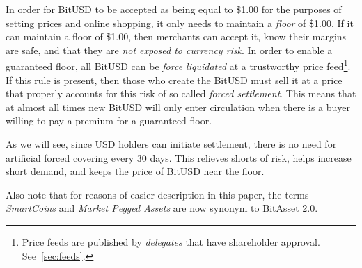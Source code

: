 In order for BitUSD to be accepted as being equal to \$1.00 for the purposes of
setting prices and online shopping, it only needs to maintain a \emph{floor} of
\$1.00. If it can maintain a floor of \$1.00, then merchants can accept it,
know their margins are safe, and that they are \emph{not exposed to currency
risk}. In order to enable a guaranteed floor, all BitUSD can be \emph{force
liquidated} at a trustworthy price feed\footnote{Price feeds are published by
\emph{delegates} that have shareholder approval. See~\cref{sec:feeds}.}. If
this rule is present, then those who create the BitUSD must sell it at a price
that properly accounts for this risk of so called \emph{forced settlement}.
This means that at almost all times new BitUSD will only enter circulation when
there is a buyer willing to pay a premium for a guaranteed floor.

As we will see, since USD holders can initiate settlement, there is no need for
artificial forced covering every 30 days. This relieves shorts of risk, helps
increase short demand, and keeps the price of BitUSD near the floor.

Also note that for reasons of easier description in this paper, the terms
\emph{SmartCoins} and \emph{Market Pegged Assets} are now synonym to BitAsset
2.0.
